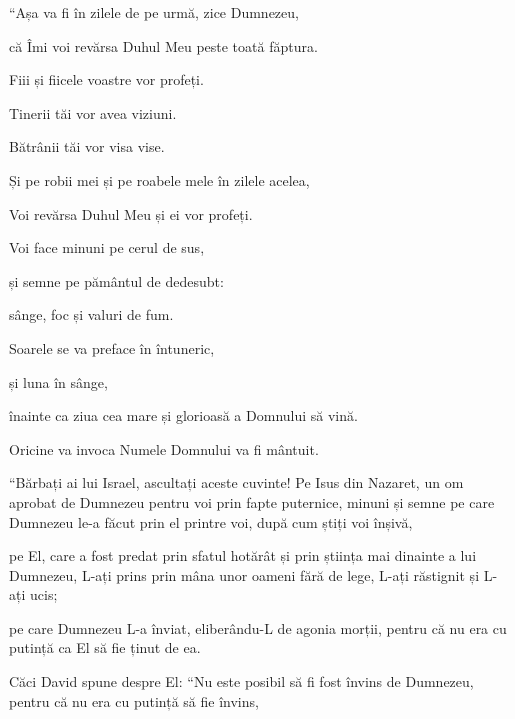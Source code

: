 {\par }{\Q {}“Așa va fi în zilele de pe urmă, zice Dumnezeu,

\par }{\QB că Îmi voi revărsa Duhul Meu peste toată făptura.

\par }{\Q Fiii și fiicele voastre vor profeți.

\par }{\QB Tinerii tăi vor avea viziuni.

\par }{\QB Bătrânii tăi vor visa vise.


\par }{\Q {}Și pe robii mei și pe roabele mele în zilele acelea,

\par }{\QB Voi revărsa Duhul Meu și ei vor profeți.


\par }{\Q {}Voi face minuni pe cerul de sus,

\par }{\QB și semne pe pământul de dedesubt:

\par }{\QB sânge, foc și valuri de fum.


\par }{\Q {}Soarele se va preface în întuneric,

\par }{\QB și luna în sânge,

\par }{\QB înainte ca ziua cea mare și glorioasă a Domnului să vină.


\par }{\Q {}Oricine va invoca Numele Domnului va fi mântuit.


\par }{\PP {}“Bărbați ai lui Israel, ascultați aceste cuvinte! Pe Isus din Nazaret, un om aprobat de Dumnezeu pentru voi prin fapte puternice, minuni și semne pe care Dumnezeu le-a făcut prin el printre voi, după cum știți voi înșivă,

pe El, care a fost predat prin sfatul hotărât și prin știința mai dinainte a lui Dumnezeu, L-ați prins prin mâna unor oameni fără de lege, L-ați răstignit și L-ați ucis;

pe care Dumnezeu L-a înviat, eliberându-L de agonia morții, pentru că nu era cu putință ca El să fie ținut de ea.

Căci David spune despre El: “Nu este posibil să fi fost învins de Dumnezeu, pentru că nu era cu putință să fie învins,

}
